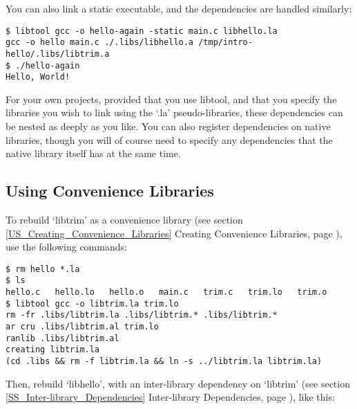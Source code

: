 You can also link a static executable, and the dependencies are handled 
similarly: 

\begin{Verbatim}
$ libtool gcc -o hello-again -static main.c libhello.la
gcc -o hello main.c ./.libs/libhello.a /tmp/intro-hello/.libs/libtrim.a
$ ./hello-again
Hello, World!
\end{Verbatim}

For your own projects, provided that you use libtool, and that you specify the libraries you wish to link using the `.la' pseudo-libraries, these dependencies can be nested as deeply as you like. You can also register dependencies on native libraries, though you will of course need to specify any dependencies that the native library itself has at the same time.

\subsection{Using Convenience Libraries}

To rebuild `libtrim' as a convenience library (see section \ref{US_Creating_Convenience_Libraries} Creating Convenience Libraries, page \pageref{US_Creating_Convenience_Libraries}), use the following commands: 

\begin{Verbatim}
$ rm hello *.la
$ ls
hello.c   hello.lo   hello.o   main.c   trim.c   trim.lo   trim.o
$ libtool gcc -o libtrim.la trim.lo
rm -fr .libs/libtrim.la .libs/libtrim.* .libs/libtrim.*
ar cru .libs/libtrim.al trim.lo
ranlib .libs/libtrim.al
creating libtrim.la
(cd .libs && rm -f libtrim.la && ln -s ../libtrim.la libtrim.la)
\end{Verbatim}

Then, rebuild `libhello', with an inter-library dependency on `libtrim' (see section \ref{SS_Inter-library_Dependencies} Inter-library Dependencies, page
\pageref{SS_Inter-library_Dependencies}), like this:

